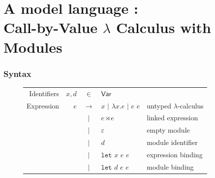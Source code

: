 \documentclass{beamer}
\theoremstyle{definition}
\newcommand*{\vbar}{|}
\newcommand*{\ExprVar}{\mathsf{Var}}
\newcommand*{\modid}{d}
\newcommand*{\link}[2]{{#1}\rtimes{#2}}
\newcommand*{\Let}{\mathtt{let}}
\begin{document}
\section{A model language :\\Call-by-Value \texorpdfstring{$\lambda$}{a} Calculus with Modules}
\begin{frame}[c]
  \frametitle{Syntax}
  \begin{figure}[h!]
    \centering
    \begin{tabular}{rrcll}
      Identifiers & $x,\modid$ & $\in$         & $\ExprVar$                                                             \\
      Expression  & $e$        & $\rightarrow$ & $x$ $\vbar$ $\lambda x.e$ $\vbar$ $e$ $e$ & untyped $\lambda$-calculus \\
                  &            & $\vbar$       & $\link{e}{e}$                             & linked expression          \\
                  &            & $\vbar$       & $\varepsilon$                             & empty module               \\
                  &            & $\vbar$       & $\modid$                                  & module identifier          \\
                  &            & $\vbar$       & $\Let$ $x$ $e$ $e$                        & expression binding         \\
                  &            & $\vbar$       & $\Let$ $\modid$ $e$ $e$                   & module binding             \\
    \end{tabular}
  \end{figure}
\end{frame}
\end{document}
